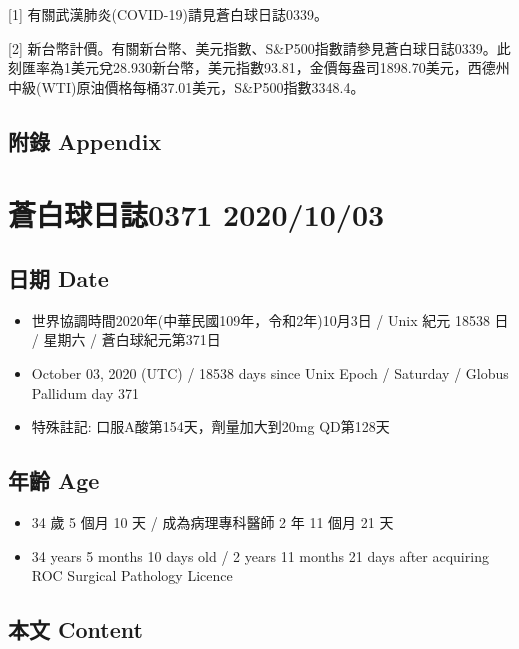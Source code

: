 \documentclass[
]{article}
\providecommand{\tightlist}{%
  \setlength{\itemsep}{0pt}\setlength{\parskip}{0pt}}
\begin{document}
{[}1{]} 有關武漢肺炎(COVID-19)請見蒼白球日誌0339。

{[}2{]}
新台幣計價。有關新台幣、美元指數、S\&P500指數請參見蒼白球日誌0339。此刻匯率為1美元兌28.930新台幣，美元指數93.81，金價每盎司1898.70美元，西德州中級(WTI)原油價格每桶37.01美元，S\&P500指數3348.4。

\hypertarget{ux9644ux9304-appendix-29}{%
\subsection{附錄 Appendix}\label{ux9644ux9304-appendix-29}}

\hypertarget{ux84bcux767dux7403ux65e5ux8a8c0371-20201003}{%
\section{蒼白球日誌0371
2020/10/03}\label{ux84bcux767dux7403ux65e5ux8a8c0371-20201003}}

\hypertarget{ux65e5ux671f-date-30}{%
\subsection{日期 Date}\label{ux65e5ux671f-date-30}}

\begin{itemize}
\tightlist
\item
  世界協調時間2020年(中華民國109年，令和2年)10月3日 / Unix 紀元 18538 日
  / 星期六 / 蒼白球紀元第371日
\item
  October 03, 2020 (UTC) / 18538 days since Unix Epoch / Saturday /
  Globus Pallidum day 371
\item
  特殊註記: 口服A酸第154天，劑量加大到20mg QD第128天
\end{itemize}

\hypertarget{ux5e74ux9f61-age-30}{%
\subsection{年齡 Age}\label{ux5e74ux9f61-age-30}}

\begin{itemize}
\tightlist
\item
  34 歲 5 個月 10 天 / 成為病理專科醫師 2 年 11 個月 21 天
\item
  34 years 5 months 10 days old / 2 years 11 months 21 days after
  acquiring ROC Surgical Pathology Licence
\end{itemize}

\hypertarget{ux672cux6587-content-30}{%
\subsection{本文 Content}\label{ux672cux6587-content-30}}
\end{document}

